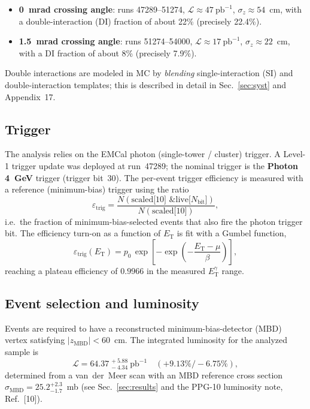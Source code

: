 \documentclass[11pt]{article}
\newcommand{\ET}{E_{\mathrm{T}}}
\newcommand{\ETg}{E_{\mathrm{T}}^{\gamma}}
\begin{document}
\begin{itemize}
  \item \textbf{0~mrad crossing angle}: runs 47289--51274,
        $\mathcal{L}\approx 47~\mathrm{pb}^{-1}$, $\sigma_z\approx 54$~cm,
        with a double-interaction (DI) fraction of about 22\% (precisely
        22.4\%).
  \item \textbf{1.5~mrad crossing angle}: runs 51274--54000,
        $\mathcal{L}\approx 17~\mathrm{pb}^{-1}$, $\sigma_z\approx 22$~cm,
        with a DI fraction of about 8\% (precisely 7.9\%).
\end{itemize}

\noindent
Double interactions are modeled in MC by \emph{blending} single-interaction (SI)
and double-interaction templates; this is described in detail in
Sec.~\ref{sec:syst} and Appendix~17.

\subsection{Trigger}

The analysis relies on the EMCal photon (single-tower / cluster) trigger. A Level-1
trigger update was deployed at run~47289; the nominal trigger is the
\textbf{Photon 4~GeV} trigger (trigger bit~30). The per-event trigger efficiency
is measured with a reference (minimum-bias) trigger using the ratio
\begin{equation}
  \varepsilon_{\mathrm{trig}}
  = \frac{N(\text{scaled[10] \& live[}N_{\mathrm{bit}}\text{]})}
         {N(\text{scaled[10]})},
\end{equation}
i.e.\ the fraction of minimum-bias-selected events that also fire the photon
trigger bit. The efficiency turn-on as a function of $\ET$ is fit with a Gumbel
function,
\begin{equation}
  \varepsilon_{\mathrm{trig}}(\ET) = p_0\,
  \exp\!\left[-\exp\!\left(-\frac{\ET-\mu}{\beta}\right)\right],
\end{equation}
reaching a plateau efficiency of $0.9966$ in the measured $\ETg$ range.

\subsection{Event selection and luminosity}

Events are required to have a reconstructed minimum-bias-detector (MBD) vertex
satisfying $|z_{\mathrm{MBD}}| < 60$~cm. The integrated luminosity for the
analyzed sample is
\begin{equation}
  \mathcal{L} = 64.37^{\,+5.88}_{\,-4.34}~\mathrm{pb}^{-1}
  \quad (+9.13\%/-6.75\%),
\end{equation}
determined from a van~der~Meer scan with an MBD reference cross section
$\sigma_{\mathrm{MBD}} = 25.2^{+2.3}_{-1.7}$~mb (see Sec.~\ref{sec:results} and
the PPG-10 luminosity note, Ref.~[10]).
\end{document}
